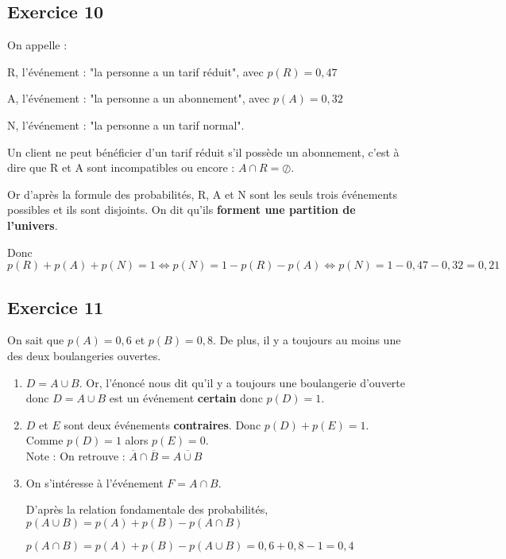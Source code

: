 \documentclass[openany]{book}
\begin{document}
 \begin{minipage}{0.5\linewidth}
 
 
 \subsection{Exercice 10}

On appelle :
\begin{description}
\item R, l'événement : "la personne a un tarif réduit", avec $p(R)=0,47$
\item A, l'événement : "la personne a un abonnement", avec $p(A)=0,32$
\item N, l'événement : "la personne a un tarif normal".
\end{description}
Un client ne peut bénéficier d’un tarif réduit s’il possède un abonnement, c'est à dire que R et A sont incompatibles ou encore :  $A \cap R = \oslash $.

Or d'après la formule des probabilités, R, A et N sont les seuls trois événements possibles et ils sont disjoints. On dit qu'ils \textbf{forment une partition de l'univers}.

Donc $p(R) + p(A)+ p(N)=1 \Longleftrightarrow p(N)=1 -p(R) -p(A) \Longleftrightarrow p(N)=1 - 0,47 - 0,32 =0,21$

 
 
 \end{minipage}

\newpage

 \begin{minipage}{0.5\linewidth}
 
 
 \subsection{Exercice 11}
 
On sait que $p(A)=0,6$ et $p(B) = 0,8$. De plus, il y a toujours au moins une des deux boulangeries ouvertes.
 
 \begin{enumerate}
\item $D = A \cup B$. Or, l'énoncé nous dit qu'il y a toujours une boulangerie d'ouverte donc $D = A \cup B$ est un événement \textbf{certain} donc $p(D)=1$.
\item $D$ et $E$ sont deux événements \textbf{contraires}. Donc $p(D)+p(E) =1$. Comme $p(D) = 1$ alors $p(E)=0$. \\
Note : On retrouve : $\overline{A} \cap \overline{B} = \overline{A \cup B}$ 
\item On s'intéresse à l'événement $F = A \cap B$.

D'après la relation fondamentale des probabilités, $p(A \cup B) = p(A) + p(B) - p(A \cap B)$  

$p(A \cap B) = p(A) + p(B) - p(A \cup B) = 0,6 + 0,8 - 1 = 0,4$ 

\end{enumerate}

\end{minipage}
\end{document}
